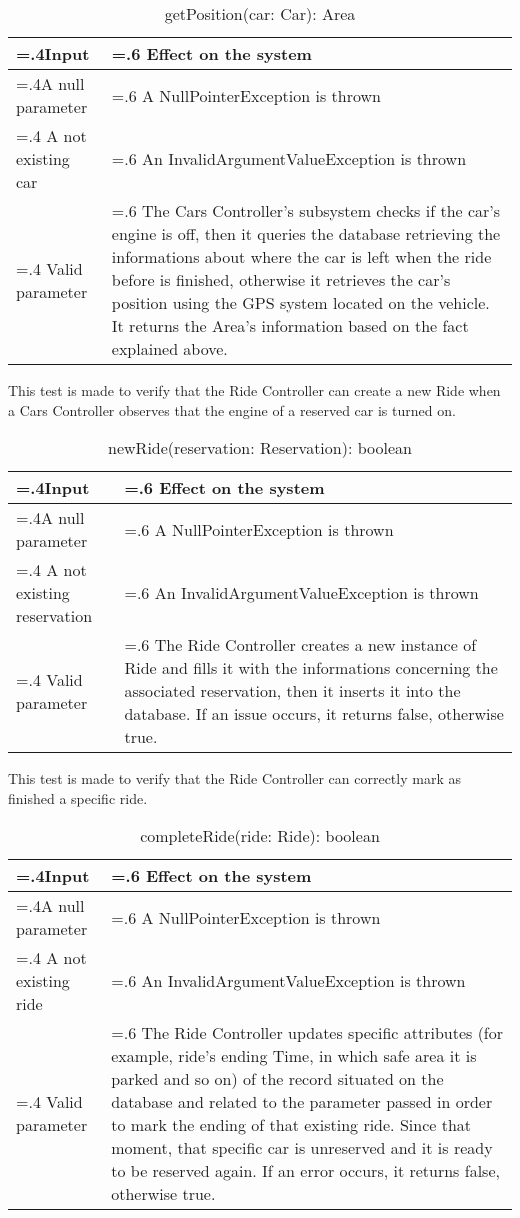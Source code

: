 \documentclass[10pt, a4paper,titlepage]{article}
\begin{document}
\begin{table}[h]
\caption{getPosition(car: Car): Area}
\begin{tabularx}{\textwidth}{|>{\hsize=.4\hsize}X|>{\hsize=.6\hsize}X|}
\hline
Input & Effect on the system\\
\hline
A null parameter & A NullPointerException is thrown\\
\hline
A not existing car & An InvalidArgumentValueException is thrown\\
\hline
Valid parameter & The Cars Controller’s subsystem checks if the car’s engine is off, then it queries the database retrieving the informations about where the car is left when the ride before is finished, otherwise it retrieves the car’s position using the GPS system located on the vehicle. It returns the Area’s information based on the fact explained above.\\
\hline
\end{tabularx}
\end{table}
\pagebreak
\linebreak
This test is made to verify that the Ride Controller can create a new Ride when a Cars Controller observes that the engine of a reserved car is turned on.
\begin{table}[h]
\caption{newRide(reservation: Reservation): boolean}
\begin{tabularx}{\textwidth}{|>{\hsize=.4\hsize}X|>{\hsize=.6\hsize}X|}
\hline
Input & Effect on the system\\
\hline
A null parameter & A NullPointerException is thrown\\
\hline
A not existing reservation & An InvalidArgumentValueException is thrown\\
\hline
Valid parameter & The Ride Controller creates a new instance of Ride and fills it with the informations concerning the associated reservation, then it inserts it into the database.
If an issue occurs, it returns false, otherwise true.\\
\hline
\end{tabularx}
\end{table}
\linebreak
This test is made to verify that the Ride Controller can correctly mark as finished a specific ride.
\begin{table}[h]
\caption{completeRide(ride: Ride): boolean}
\begin{tabularx}{\textwidth}{|>{\hsize=.4\hsize}X|>{\hsize=.6\hsize}X|}
\hline
Input & Effect on the system\\
\hline
A null parameter & A NullPointerException is thrown\\
\hline
A not existing ride & An InvalidArgumentValueException is thrown\\
\hline
Valid parameter & The Ride Controller updates specific attributes (for example, ride’s ending Time, in which safe area it is parked and so on) of the record situated on the database and related to the parameter passed in order to mark the ending of that existing ride. Since that moment, that specific car is unreserved and it is ready to be reserved again. If an error occurs, it returns false, otherwise true.\\
\hline
\end{tabularx}
\end{table}
\end{document}
